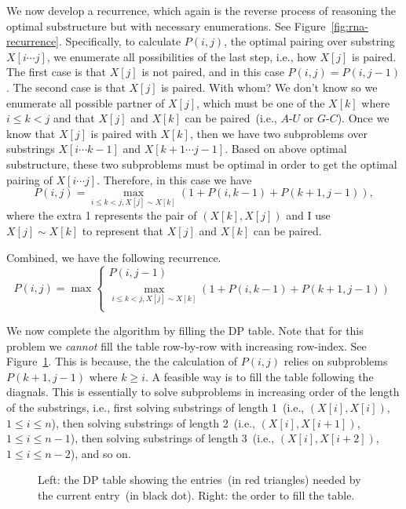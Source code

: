 We now develop a recurrence, which again is the reverse process of reasoning the optimal substructure
but with necessary enumerations.
See Figure~\ref{fig:rna-recurrence}.
Specifically, to calculate $P(i,j)$, the optimal pairing over substring $X[i\cdots j]$,
we enumerate all possibilities of the last step, i.e., how $X[j]$ is paired.
The first case is that $X[j]$ is not paired, and in this case $P(i,j) = P(i, j-1)$.
The second case is that $X[j]$ is paired. With whom? We don't know so we enumerate
all possible partner of $X[j]$, which must be one of the $X[k]$ where $i \le k < j$
and that $X[j]$ and $X[k]$ can be paired~(i.e., $A$-$U$ or $G$-$C$).
Once we know that $X[j]$ is paired with $X[k]$, then we have two subproblems
over substrings $X[i\cdots k-1]$ and $X[k + 1 \cdots j - 1]$. Based on above optimal substructure,
these two subproblems must be optimal in order to get the optimal pairing of $X[i\cdots j]$.
Therefore, in this case we have 
$$P(i,j) = \max_{i \le k < j, X[j]\sim X[k] } (1 + P(i, k-1) + P(k+1,j-1)),$$
where the extra 1 represents the pair of $(X[k], X[j])$ and I use $X[j]\sim X[k]$ to represent that $X[j]$ and $X[k]$ can be paired.

Combined, we have the following recurrence.
\begin{displaymath}
P(i,j) = \max\left\{
	\begin{array}{llll}
	P(i,j-1)\\
	\textstyle \max_{i \le k < j, X[j]\sim X[k]} (1 + P(i,k-1) + P(k+1,j-1)) \\
	\end{array}
\right.
\end{displaymath}



We now complete the algorithm by filling the DP table.
Note that for this problem we \emph{cannot} fill the table row-by-row with increasing row-index.
See Figure~\ref{fig:rna-table}.
This is because, the the calculation of $P(i,j)$ relies on subproblems $P(k + 1, j - 1)$ where $k \ge i$.
A feasible way is to fill the table following the diagnals.
This is essentially to solve subproblems in increasing order of the length of the substrings, i.e.,
first solving substrings of length 1~(i.e., $(X[i], X[i])$, $1\le i \le n$), 
then solving substrings of length 2~(i.e., $(X[i], X[i + 1])$, $1\le i \le n - 1$), 
then solving substrings of length 3~(i.e., $(X[i], X[i + 2])$, $1\le i \le n - 2$),
and so on. 

\begin{figure}[h]
\centering{}
\caption{Left: the DP table showing the entries~(in red triangles) needed by the current entry~(in black dot).
Right: the order to fill the table.}
\label{fig:rna-table}
\end{figure}

